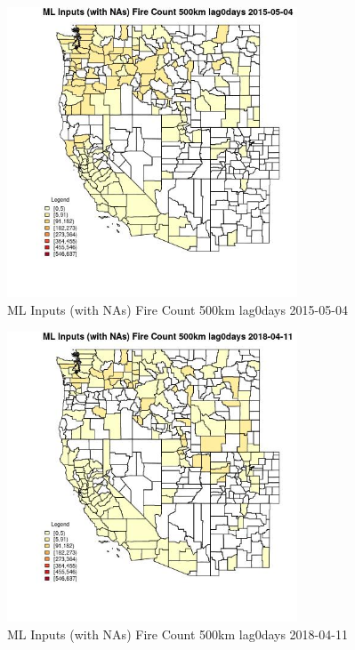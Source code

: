 \begin{figure} 
\centering  
\includegraphics[width=0.77\textwidth]{Code_Outputs/Report_ML_input_PM25_Step4_part_e_de_duplicated_aves_compiled_2019-05-18wNAs_CountyFire_Count_500km_lag0daysMean2015-05-04.jpg} 
\caption{\label{fig:Report_ML_input_PM25_Step4_part_e_de_duplicated_aves_compiled_2019-05-18wNAsCountyFire_Count_500km_lag0daysMean2015-05-04}ML Inputs (with NAs) Fire Count 500km lag0days 2015-05-04} 
\end{figure} 
 

\begin{figure} 
\centering  
\includegraphics[width=0.77\textwidth]{Code_Outputs/Report_ML_input_PM25_Step4_part_e_de_duplicated_aves_compiled_2019-05-18wNAs_CountyFire_Count_500km_lag0daysMean2018-04-11.jpg} 
\caption{\label{fig:Report_ML_input_PM25_Step4_part_e_de_duplicated_aves_compiled_2019-05-18wNAsCountyFire_Count_500km_lag0daysMean2018-04-11}ML Inputs (with NAs) Fire Count 500km lag0days 2018-04-11} 
\end{figure} 
 

